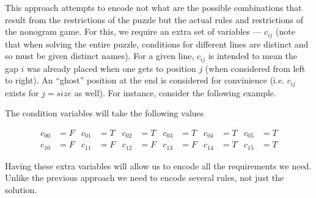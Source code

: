 \documentclass[12pt]{article}
\begin{document}
This approach attempts to encode not what are the possible combinations that result from the restrictions of the puzzle but the actual rules and restrictions of the nonogram game.
For this, we require an extra set of variables — $c_{ij}$ (note that when solving the entire puzzle, conditions for different lines are distinct and so must be given distinct names).
For a given line, $c_{ij}$ is intended to mean the gap $i$ was already placed when one gets to position $j$ (when considered from left to right). An ``ghost'' position at the end is considered for convinience (i.e. $c_{ij}$ exists for $j = size$ as well).
For instance, consider the following example.

\begin{center}
\end{center}

\noindent The condition variables will take the following values

\begin{align*}
c_{00} &= F & c_{01} &= T & c_{02} &= T & c_{03} &= T & c_{04} &= T & c_{05} &= T \\
c_{10} &= F & c_{11} &= F & c_{12} &= F & c_{13} &= F & c_{14} &= T & c_{15} &= T
\end{align*}

\noindent Having these extra variables will allow us to encode all the requirements we need. Unlike the previous approach we need to encode several rules, not just the solution.
\end{document}
